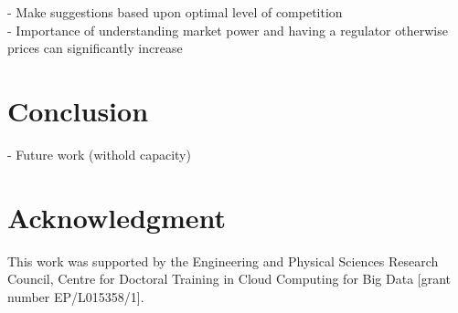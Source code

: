 \documentclass[conference]{IEEEtran}
\begin{document}
- Make suggestions based upon optimal level of competition \\
- Importance of understanding market power and having a regulator otherwise prices can significantly increase

\section{Conclusion}
\label{sec:conclusion}
- Future work (withold capacity)


\section{Acknowledgment}

This work was supported by the Engineering and Physical Sciences Research Council, Centre for Doctoral Training in Cloud Computing for Big Data [grant number EP/L015358/1].





\end{document}

